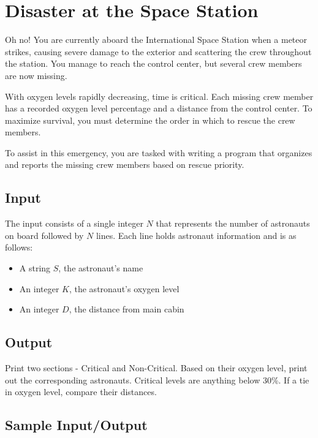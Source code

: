 \documentclass{article}
\let\oldsection\section
\renewcommand\section{\clearpage\oldsection}
\begin{document}
\section{Disaster at the Space Station}

Oh no! You are currently aboard the International Space Station when a meteor strikes, causing severe damage to the exterior and scattering the crew throughout the station. You manage to reach the control center, but several crew members are now missing.

With oxygen levels rapidly decreasing, time is critical. Each missing crew member has a recorded oxygen level percentage and a distance from the control center. 
To maximize survival, you must determine the order in which to rescue the crew members.

To assist in this emergency, you are tasked with writing a program that organizes and reports the missing crew members based on rescue priority.

\subsection{Input}

The input consists of a single integer $N$ that represents the number of astronauts on board followed by $N$ lines. 
\newline \newline Each line holds astronaut information and is as follows:
\begin{itemize}
    \item A string $S$, the astronaut's name
    \item An integer $K$, the astronaut's oxygen level
    \item An integer $D$, the distance from main cabin
\end{itemize}

\subsection{Output}

Print two sections - Critical and Non-Critical. Based on their oxygen level, print out the corresponding astronauts. Critical levels are anything below 30\%. If a tie in oxygen level, compare their distances.

\subsection{Sample Input/Output}
\end{document}

